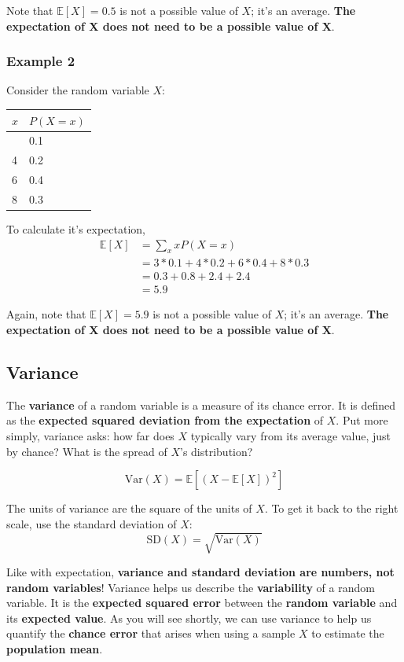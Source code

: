 \documentclass[
  letterpaper,
  DIV=11,
  numbers=noendperiod]{scrreprt}
\begin{document}
Note that \(\mathbb{E}[X] = 0.5\) is not a possible value of \(X\); it's
an average. \textbf{The expectation of X does not need to be a possible
value of X}.

\subsubsection{Example 2}\label{example-2-1}

Consider the random variable \(X\):

\begin{longtable}[]{@{}ll@{}}
\toprule\noalign{}
\(x\) & \(P(X=x)\) \\
\midrule\noalign{}
\endhead
\bottomrule\noalign{}
\endlastfoot
3 & 0.1 \\
4 & 0.2 \\
6 & 0.4 \\
8 & 0.3 \\
\end{longtable}

To calculate it's expectation, \[\begin{align}
 \mathbb{E}[X] &= \sum_{x} x P(X=x) \\
 &= 3 * 0.1 + 4 * 0.2 + 6 * 0.4 + 8 * 0.3 \\
 &= 0.3 + 0.8 + 2.4 + 2.4 \\
 &= 5.9
\end{align}\]

Again, note that \(\mathbb{E}[X] = 5.9\) is not a possible value of
\(X\); it's an average. \textbf{The expectation of X does not need to be
a possible value of X}.

\subsection{Variance}\label{variance}

The \textbf{variance} of a random variable is a measure of its chance
error. It is defined as the \textbf{expected squared deviation from the
expectation} of \(X\). Put more simply, variance asks: how far does
\(X\) typically vary from its average value, just by chance? What is the
spread of \(X\)'s distribution?

\[\text{Var}(X) = \mathbb{E}[(X-\mathbb{E}[X])^2]\]

The units of variance are the square of the units of \(X\). To get it
back to the right scale, use the standard deviation of \(X\):
\[\text{SD}(X) = \sqrt{\text{Var}(X)}\]

Like with expectation, \textbf{variance and standard deviation are
numbers, not random variables}! Variance helps us describe the
\textbf{variability} of a random variable. It is the \textbf{expected
squared error} between the \textbf{random variable} and its
\textbf{expected value}. As you will see shortly, we can use variance to
help us quantify the \textbf{chance error} that arises when using a
sample \(X\) to estimate the \textbf{population mean}.
\end{document}
